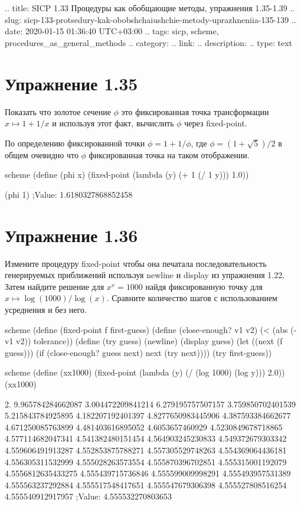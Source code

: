 .. title: SICP 1.33 Процедуры как обобщающие методы, упражнения 1.35-1.39
.. slug: sicp-133-protsedury-kak-obobshchaiushchie-metody-uprazhneniia-135-139
.. date: 2020-01-15 01:36:40 UTC+03:00
.. tags: sicp, scheme, procedures_as_general_methods
.. category: 
.. link: 
.. description: 
.. type: text


\chapter{Упражнение 1.35}

Показать что золотое сечение $\phi$ это фиксированная точка трансформации $x\mapsto1+1/x$ и используя этот факт, вычислить $\phi$ через fixed-point.

По определению фиксированной точки $\phi=1+1/\phi$, где $\phi=(1+\sqrt{5})/2$ в общем очевидно что $\phi$ фиксированная точка на таком отображении.


\begin{codelisting}{scheme}
(define (phi x)
  (fixed-point (lambda (y) (+ 1 (/ 1 y)))
  1.0))

(phi 1) ;Value: 1.6180327868852458
\end{codelisting}

\chapter{Упражнение 1.36}

Измените процедуру fixed-point чтобы она печатала последовательность генерируемых приближений используя newline и display из упражнения 1.22. Затем найдите решение для $x^x=1000$ найдя фиксированную точку для $x\mapsto\log(1000)/\log(x)$. Сравните количество шагов с использованием усреднения и без него.

\begin{codelisting}{scheme}
(define (fixed-point f first-guess)
  (define (close-enough? v1 v2)
    (< (abs (- v1 v2)) tolerance))
  (define (try guess)
    (newline)
    (display guess)
    (let ((next (f guess)))
      (if (close-enough? guess next)
          next
          (try next))))
  (try first-guess))
\end{codelisting}

\begin{codelisting}{scheme}
(define (xx1000)
  (fixed-point (lambda (y) (/ (log 1000) (log y)))
               2.0))
(xx1000)
\end{codelisting}

2.
9.965784284662087
3.004472209841214
6.279195757507157
3.759850702401539
5.215843784925895
4.182207192401397
4.8277650983445906
4.387593384662677
4.671250085763899
4.481403616895052
4.6053657460929
4.5230849678718865
4.577114682047341
4.541382480151454
4.564903245230833
4.549372679303342
4.559606491913287
4.552853875788271
4.557305529748263
4.554369064436181
4.556305311532999
4.555028263573554
4.555870396702851
4.555315001192079
4.5556812635433275
4.555439715736846
4.555599009998291
4.555493957531389
4.555563237292884
4.555517548417651
4.555547679306398
4.555527808516254
4.555540912917957
;Value: 4.555532270803653

